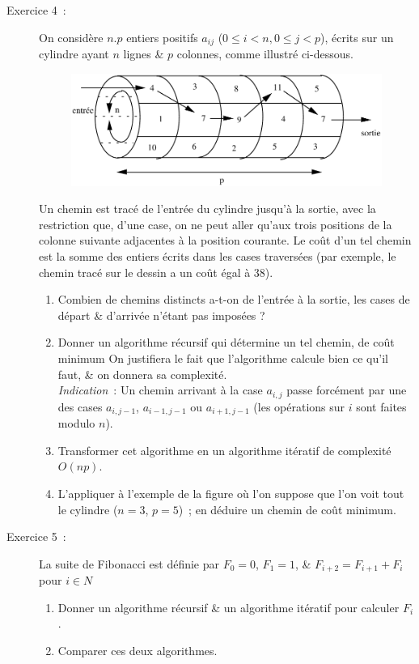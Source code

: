 \documentclass
[12pt]
{article}
\begin{document}
\begin{description}
\item[Exercice 4~:] On considère $n.p$ entiers positifs $a_{ij}$ ($0\leq i< n, 0\leq
j< p$), écrits sur un cylindre ayant $n$ lignes \& $p$ colonnes,
comme illustré ci-dessous.%
%
\begin{figure}[h!]
\begin{center}
\includegraphics[scale=0.5]{Cyl1}
\end{center}
\end{figure}
Un chemin est tracé de l'entrée du cylindre jusqu'à la sortie, avec la
restriction que, d'une case, on ne peut aller qu'aux trois positions
de la colonne suivante adjacentes à la position courante. Le coût d'un
tel chemin est la somme des entiers écrits dans les cases traversées
(par exemple, le chemin tracé sur le dessin a un coût égal à 38).

\begin{enumerate}
\item {Combien} de chemins distincts a-t-on de l'entrée à la
sortie, les cases de départ \& d'arrivée n'étant pas imposées ?



\item {Donner} un algorithme récursif qui détermine un tel chemin, de
coût minimum On justifiera le fait
que l'algorithme calcule bien ce qu'il faut, \& on donnera   sa complexité.\\
{\it Indication}~: Un chemin arrivant à la case $a_{i,j}$ passe forcément par une des cases $a_{i,j-1}$, $a_{i-1,j-1}$ ou $a_{i+1,j-1}$ (les opérations sur $i$ sont faites modulo $n$).

\item Transformer cet algorithme en un algorithme itératif de complexité $O(np)$.

\item {L'appliquer} à l'exemple de la figure %
où l'on suppose que l'on voit tout le cylindre
($n=3$, $p=5$)~;
en déduire un chemin de coût minimum.
\end{enumerate}

\item[Exercice 5~:] La suite de Fibonacci est définie par $F_0 = 0$, $F_1= 1 $, \& $F_{i+2} = F_{i+1} + F_i$ pour $i \in N$ 
\begin{enumerate}
\item Donner un algorithme récursif \& un algorithme itératif pour calculer $F_i$. 

\item Comparer ces deux algorithmes.
\end{enumerate}

\end{description}
\end{document}
